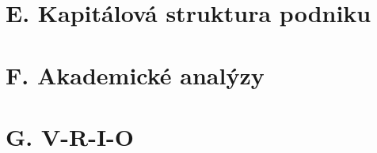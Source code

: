 \section*{E. Kapitálová struktura podniku}
\label{sec:Kapitalova struktura podniku}

\section*{F. Akademické analýzy}
\label{sec:Akademicke analyzy}

\section*{G. V-R-I-O}
\label{sec:V-R-I-O}
